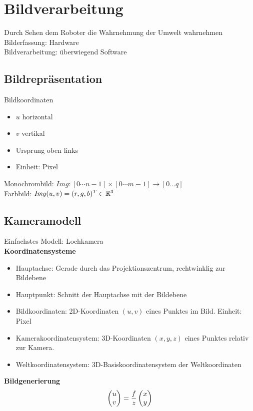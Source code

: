 

\section{Bildverarbeitung}
Durch Sehen dem Roboter die Wahrnehmung der Umwelt wahrnehmen\\
Bilderfassung: Hardware\\
Bildverarbeitung: überwiegend Software

\subsection{Bildrepräsentation}
Bildkoordinaten
\begin{itemize}
\item \(u\) horizontal
\item \(v\) vertikal
\item Ursprung oben links
\item Einheit: Pixel
\end{itemize}

Monochrombild: \(\mathit{Img}: [0 \cdots n - 1] \times [0 \cdots m-1] \rightarrow [0\dots q]\)\\
Farbbild: \(\mathit{Img}(u,v) = (r,g,b)^T \in \mathbb{R}^3\)

\subsection{Kameramodell}
Einfachstes Modell: Lochkamera\\

\textbf{Koordinatensysteme}
\begin{itemize}
\item Hauptachse: Gerade durch das Projektionszentrum, rechtwinklig zur Bildebene
\item Hauptpunkt: Schnitt der Hauptachse mit der Bildebene
\item Bildkoordinaten: 2D-Koordinaten \((u, v)\) eines Punktes im Bild. Einheit: Pixel
\item Kamerakoordinatensystem: 3D-Koordinaten \((x, y, z)\) eines Punktes relativ zur Kamera.
\item Weltkoordinatensystem: 3D-Basiskoordinatensystem der Weltkoordinaten
\end{itemize}

\textbf{Bildgenerierung}\\
\[\begin{pmatrix}u \\ v\end{pmatrix} = \frac{f}{z}\begin{pmatrix}x \\ y\end{pmatrix}\]

